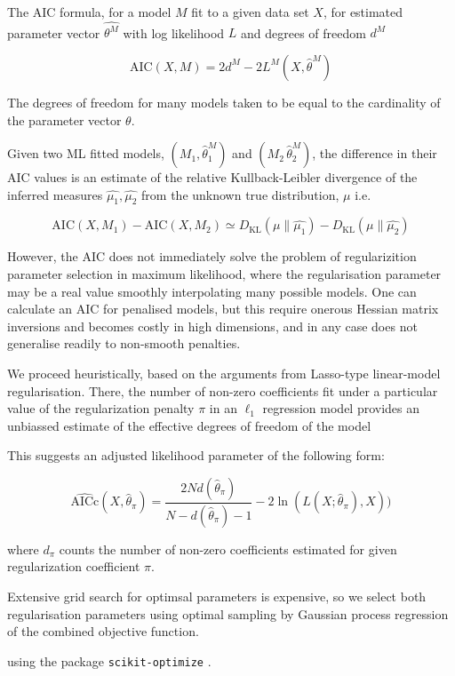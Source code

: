 \documentclass[11pt]{article}
\begin{document}
The AIC formula, for a model $M$ fit to a given data set $X$, for
estimated parameter vector $\hat{\theta^M}$ with log likelihood $L$ and
degrees of freedom $d^M$

\[\mathrm{AIC}(X,M)=2d^M-2L^M(X,\hat{\theta}^M)\]

The degrees of freedom for many models taken to be equal to the
cardinality of the parameter vector $\theta$.

Given two ML fitted models, $(M_1,\hat{\theta}^M_1)$ and
$(M_2\,\hat{\theta}^M_2)$, the difference in their AIC values is an
estimate of the relative Kullback-Leibler divergence of the inferred
measures $\hat{\mu_1},\hat{\mu_2}$ from the unknown true distribution,
$\mu$ i.e.

\[\mathrm{AIC}(X,M_1)-\mathrm{AIC}(X,M_2) \simeq D_\mathrm{KL}(\mu\|\hat{\mu_1}) - D_\mathrm{KL}(\mu\|\hat{\mu_2})\]

However, the AIC does not immediately solve the problem of
regularizition parameter selection in maximum likelihood, where the
regularisation parameter may be a real value smoothly interpolating many
possible models. One can calculate an AIC for penalised models, but this
require onerous Hessian matrix inversions and becomes costly in high
dimensions, and in any case does not generalise readily to non-smooth
penalties. \cite{konishi_information_2008}

We proceed heuristically, based on the arguments from Lasso-type
linear-model regularisation. There, the number of non-zero coefficients
fit under a particular value of the regularization penalty $\pi$ in an
$\ell_1$ regression model provides an unbiassed estimate of the
effective degrees of freedom of the model \cite{zou_degrees_2007}

    This suggests an adjusted likelihood parameter of the following form:

\[
\widehat{\mathrm{AICc}}(X, \hat{\theta}_\pi) = {\frac {2Nd(\hat{\theta}_\pi) }{N-d(\hat{\theta}_\pi)-1}} - 2\ln(L(X;\hat{\theta}_\pi), X))
\]

where $d_\pi$ counts the number of non-zero coefficients estimated for
given regularization coefficient $\pi$.

    Extensive grid search for optimsal parameters is expensive, so we select
both regularisation parameters using optimal sampling by Gaussian
process regression of the combined objective function.

\cite{snoek_practical_2012} using the package \texttt{scikit-optimize}
\cite{andreh7_scikit-optimize_2017} .
\end{document}
